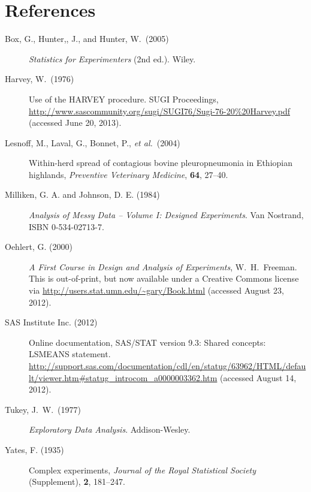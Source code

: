 \documentclass{article}
\begin{document}
\section*{References}
\begin{description}

\item[Box, G., Hunter,, J., and Hunter, W.~(2005)]
\emph{Statistics for Experimenters} (2nd ed.).
Wiley.

\item[Harvey, W.~(1976)] Use of the HARVEY procedure.
SUGI Proceedings, 
\url{http://www.sascommunity.org/sugi/SUGI76/Sugi-76-20%20Harvey.pdf} (accessed June 20, 2013).

\item[Lesnoff, M., Laval, G., Bonnet, P., \emph{et al.}~(2004)] Within-herd spread of contagious bovine pleuropneumonia in Ethiopian highlands, \emph{Preventive Veterinary Medicine},  \textbf{64}, 27--40.

\item[Milliken, G. A. and Johnson, D. E. (1984)]
\emph{Analysis of Messy Data -- Volume I: Designed Experiments}. Van Nostrand, ISBN 0-534-02713-7.


\item[Oehlert, G. (2000)] \emph{A First Course in Design and Analysis of Experiments}, W.~H.~Freeman.
This is out-of-print, but now available under a Creative Commons license via \url{http://users.stat.umn.edu/~gary/Book.html} (accessed August 23, 2012).

\item[SAS Institute Inc. (2012)]
Online documentation, SAS/STAT version 9.3: Shared concepts: LSMEANS statement.
\url{http://support.sas.com/documentation/cdl/en/statug/63962/HTML/default/viewer.htm#statug_introcom_a0000003362.htm} (accessed August 14, 2012).

\item[Tukey, J.~W.~(1977)] \emph{Exploratory Data Analysis}. Addison-Wesley. 

\item[Yates, F. (1935)] Complex experiments, \emph{Journal of the Royal Statistical Society} (Supplement), \textbf{2}, 181--247.

\end{description}
\end{document}
